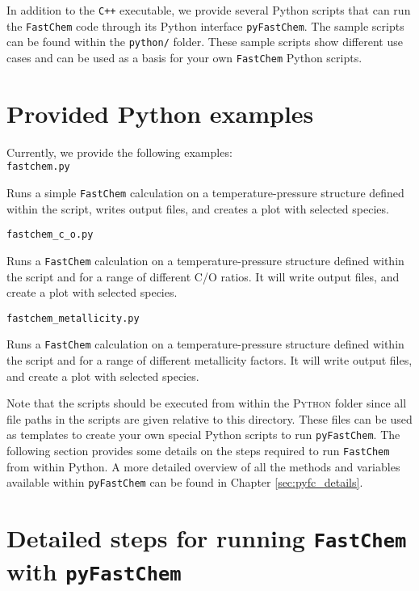 \documentclass[numbers=noenddot]{fcmanual}
\newcommand{\fc}{\texttt{FastChem}\xspace}
\newcommand{\pfc}{\texttt{pyFastChem}\xspace}
\newcommand{\cpp}{\ttt{C++}\xspace}
\newcommand{\ttt}[1]{\texttt {#1}}
\begin{document}
In addition to the \cpp executable, we provide several Python scripts that can run the \fc code through its Python interface \pfc. The sample scripts can be found within the \verb|python/| folder. These sample scripts show different use cases and can be used as a basis for your own \fc Python scripts.

\section{Provided Python examples}
\label{sec:pyfc_examples}
Currently, we provide the following examples:\\

\lstinline!fastchem.py!
\begin{addmargin}[25pt]{0pt}
  Runs a simple \fc calculation on a temperature-pressure structure defined within the script, writes output files, and creates a plot with selected species.\\
\end{addmargin}

\lstinline!fastchem_c_o.py!
\begin{addmargin}[25pt]{0pt}
  Runs a \fc calculation on a temperature-pressure structure defined within the script and for a range of different C/O ratios. It will write output files, and create a plot with selected species.\\
\end{addmargin}

\lstinline!fastchem_metallicity.py!
\begin{addmargin}[25pt]{0pt}
  Runs a \fc calculation on a temperature-pressure structure defined within the script and for a range of different metallicity factors. It will write output files, and create a plot with selected species.\\
\end{addmargin}

Note that the scripts should be executed from within the \textsc{Python} folder since all file paths in the scripts are given relative to this directory.
These files can be used as templates to create your own special Python scripts to run \pfc. The following section provides some details on the steps required to run \fc from within Python. A more detailed overview of all the methods and variables available within \pfc can be found in Chapter \ref{sec:pyfc_details}.


\section{Detailed steps for running \fc with \pfc}
\end{document}
